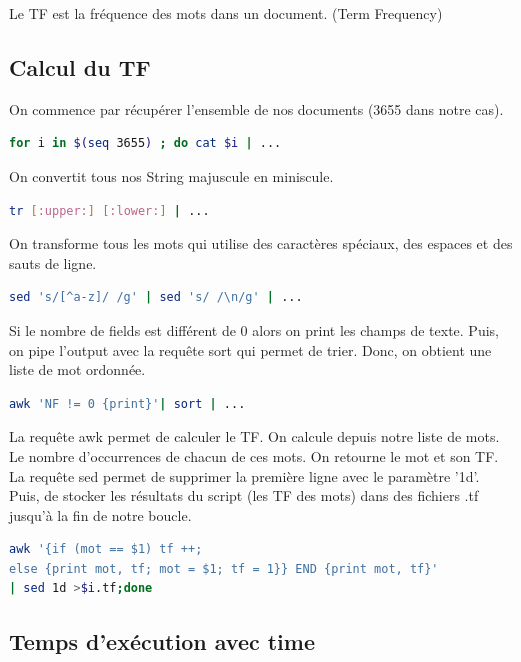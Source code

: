 \documentclass{article}
\begin{document}
Le TF est la fréquence des mots dans un document. (Term Frequency)

\subsection{Calcul du TF}

On commence par récupérer l'ensemble de nos documents (3655 dans notre cas).

\begin{lstlisting}[language=bash,caption={Bouclage}]
for i in $(seq 3655) ; do cat $i | ...
\end{lstlisting}

On convertit tous nos String majuscule en miniscule.

\begin{lstlisting}[language=bash,caption={Miniscule}]
tr [:upper:] [:lower:] | ...
\end{lstlisting}

On transforme tous les mots qui utilise des caractères spéciaux, des espaces et des sauts de ligne.

\begin{lstlisting}[language=bash,caption={Caractères spéciaux}]
sed 's/[^a-z]/ /g' | sed 's/ /\n/g' | ...
\end{lstlisting}


Si le nombre de fields est différent de 0 alors on print les champs de texte. Puis, on pipe l'output avec la requête sort qui permet de trier. Donc, on obtient une liste de mot ordonnée.

\begin{lstlisting}[language=bash,caption={Liste de mots triés}]
awk 'NF != 0 {print}'| sort | ...
\end{lstlisting}

La requête awk permet de calculer le TF. On calcule depuis notre liste de mots. Le nombre d'occurrences de chacun de ces mots. On retourne le mot et son TF.
La requête sed permet de supprimer la première ligne avec le paramètre '1d'. Puis, de stocker les résultats du script (les TF des mots) dans des fichiers .tf jusqu'à la fin de notre boucle.

\begin{lstlisting}[language=bash,caption={Calcul du TF}]
awk '{if (mot == $1) tf ++; 
else {print mot, tf; mot = $1; tf = 1}} END {print mot, tf}' 
| sed 1d >$i.tf;done
\end{lstlisting}

\subsection{Temps d'exécution avec time}
\end{document}
